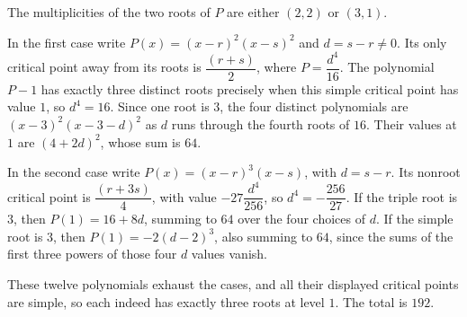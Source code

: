 The multiplicities of the two roots of $P$ are either $(2,2)$ or $(3,1)$.

In the first case write $P(x)=(x-r)^2(x-s)^2$ and $d=s-r\ne0$. Its only critical point away from its roots is $\dfrac{(r+s)}{2}$, where $P=\dfrac{d^4}{16}$. The polynomial $P-1$ has exactly three distinct roots precisely when this simple critical point has value $1$, so $d^4=16$. Since one root is $3$, the four distinct polynomials are $(x-3)^2(x-3-d)^2$ as $d$ runs through the fourth roots of $16$. Their values at $1$ are $(4+2d)^2$, whose sum is $64$.

In the second case write $P(x)=(x-r)^3(x-s)$, with $d=s-r$. Its nonroot critical point is $\dfrac{(r+3s)}{4}$, with value $-27\dfrac{d^4}{256}$, so $d^4=-\dfrac{256}{27}$. If the triple root is $3$, then $P(1)=16+8d$, summing to $64$ over the four choices of $d$. If the simple root is $3$, then $P(1)=-2(d-2)^3$, also summing to $64$, since the sums of the first three powers of those four $d$ values vanish.

These twelve polynomials exhaust the cases, and all their displayed critical points are simple, so each indeed has exactly three roots at level $1$. The total is $\boxed{192}$.
